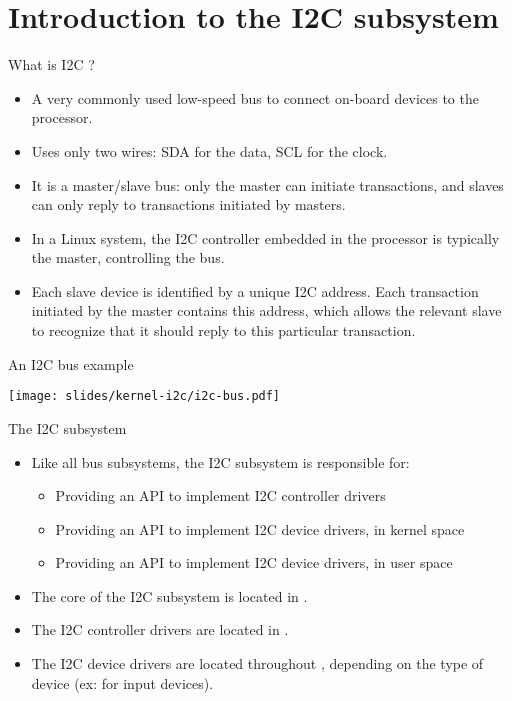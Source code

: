 \section{Introduction to the I2C subsystem}

\begin{frame}{What is I2C ?}
  \begin{itemize}
  \item A very commonly used low-speed bus to connect on-board
    devices to the processor.
  \item Uses only two wires: SDA for the data, SCL for the clock.
  \item It is a master/slave bus: only the master can initiate
    transactions, and slaves can only reply to transactions initiated
    by masters.
  \item In a Linux system, the I2C controller embedded in the
    processor is typically the master, controlling the bus.
  \item Each slave device is identified by a unique I2C address. Each
    transaction initiated by the master contains this address, which
    allows the relevant slave to recognize that it should reply to
    this particular transaction.
  \end{itemize}
\end{frame}

\begin{frame}{An I2C bus example}
  \begin{center}
    \texttt{[image: slides/kernel-i2c/i2c-bus.pdf]}
  \end{center}
\end{frame}

\begin{frame}{The I2C subsystem}
  \begin{itemize}
  \item Like all bus subsystems, the I2C subsystem is responsible for:
    \begin{itemize}
    \item Providing an API to implement I2C controller drivers
    \item Providing an API to implement I2C device drivers, in kernel space
    \item Providing an API to implement I2C device drivers, in user space
    \end{itemize}
  \item The core of the I2C subsystem is located in
    .
  \item The I2C controller drivers are located in
    .
  \item The I2C device drivers are located throughout
    , depending on the type of device (ex:
     for input devices).
  \end{itemize}
\end{frame}

